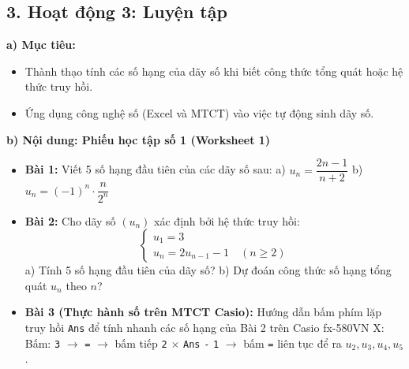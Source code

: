 \documentclass[12pt, a4paper]{article}
\begin{document}
\subsection*{3. Hoạt động 3: Luyện tập}  
  
\noindent \textbf{a) Mục tiêu:}  
\begin{itemize}[leftmargin=0.8cm]  
    \item Thành thạo tính các số hạng của dãy số khi biết công thức tổng quát hoặc hệ thức truy hồi.  
    \item Ứng dụng công nghệ số (Excel và MTCT) vào việc tự động sinh dãy số.  
\end{itemize}  
  
\noindent \textbf{b) Nội dung: Phiếu học tập số 1 (Worksheet 1)}  
\begin{itemize}[leftmargin=0.6cm]  
    \item \textbf{Bài 1:} Viết 5 số hạng đầu tiên của các dãy số sau:  
    a) $u_n = \dfrac{2n - 1}{n + 2}$ \qquad b) $u_n = (-1)^n \cdot \dfrac{n}{2^n}$  
    \item \textbf{Bài 2:} Cho dãy số $(u_n)$ xác định bởi hệ thức truy hồi:  
    $$\begin{cases} u_1 = 3 \\ u_n = 2u_{n-1} - 1 \quad (n \ge 2) \end{cases}$$  
    a) Tính 5 số hạng đầu tiên của dãy số?  
    b) Dự đoán công thức số hạng tổng quát $u_n$ theo $n$?  
    \item \textbf{Bài 3 (Thực hành số trên MTCT Casio):}  
    Hướng dẫn bấm phím lặp truy hồi \texttt{Ans} để tính nhanh các số hạng của Bài 2 trên Casio fx-580VN X:  
    Bấm: \texttt{3} $\to$ \texttt{=} $\to$ bấm tiếp \texttt{2} $\times$ \texttt{Ans} \texttt{-} \texttt{1} $\to$ bấm \texttt{=} liên tục để ra $u_2, u_3, u_4, u_5$.  
\end{itemize}  
  
\end{document}
